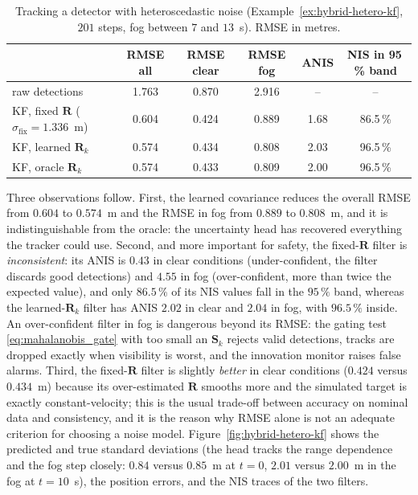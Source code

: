 \documentclass[graybox,envcountchap]{style/SNmono}
\begin{document}
\begin{example}
\begin{table}[!t]
    \centering
    \small
    \caption{Tracking a detector with heteroscedastic noise (Example~\ref{ex:hybrid-hetero-kf}, $201$ steps, fog between $7$ and $13$~s). RMSE in metres.}
    \label{tab:hetero-kf-results}
    \begin{tabular}{l c c c c c}
        \hline
        & \textbf{RMSE all} & \textbf{RMSE clear} & \textbf{RMSE fog} & \textbf{ANIS} & \textbf{NIS in 95\,\% band} \\
        \hline
        raw detections & 1.763 & 0.870 & 2.916 & -- & -- \\
        KF, fixed $\mathbf{R}$ ($\sigma_{\mathrm{fix}}=1.336$~m) & 0.604 & 0.424 & 0.889 & 1.68 & 86.5\,\% \\
        KF, learned $\mathbf{R}_k$ & 0.574 & 0.434 & 0.808 & 2.03 & 96.5\,\% \\
        KF, oracle $\mathbf{R}_k$ & 0.574 & 0.433 & 0.809 & 2.00 & 96.5\,\% \\
        \hline
    \end{tabular}
\end{table}
Three observations follow. First, the learned covariance reduces the overall RMSE from $0.604$ to $0.574$~m and the RMSE in fog from $0.889$ to $0.808$~m, and it is indistinguishable from the oracle: the uncertainty head has recovered everything the tracker could use. Second, and more important for safety, the fixed-$\mathbf{R}$ filter is \emph{inconsistent}: its ANIS is $0.43$ in clear conditions (under-confident, the filter discards good detections) and $4.55$ in fog (over-confident, more than twice the expected value), and only $86.5\,\%$ of its NIS values fall in the $95\,\%$ band, whereas the learned-$\mathbf{R}_k$ filter has ANIS $2.02$ in clear and $2.04$ in fog, with $96.5\,\%$ inside. An over-confident filter in fog is dangerous beyond its RMSE: the gating test \eqref{eq:mahalanobis_gate} with too small an $\mathbf{S}_k$ rejects valid detections, tracks are dropped exactly when visibility is worst, and the innovation monitor raises false alarms. Third, the fixed-$\mathbf{R}$ filter is slightly \emph{better} in clear conditions ($0.424$ versus $0.434$~m) because its over-estimated $\mathbf{R}$ smooths more and the simulated target is exactly constant-velocity; this is the usual trade-off between accuracy on nominal data and consistency, and it is the reason why RMSE alone is not an adequate criterion for choosing a noise model. Figure~\ref{fig:hybrid-hetero-kf} shows the predicted and true standard deviations (the head tracks the range dependence and the fog step closely: $0.84$ versus $0.85$~m at $t=0$, $2.01$ versus $2.00$~m in the fog at $t=10$~s), the position errors, and the NIS traces of the two filters.
\end{example}
\end{document}
